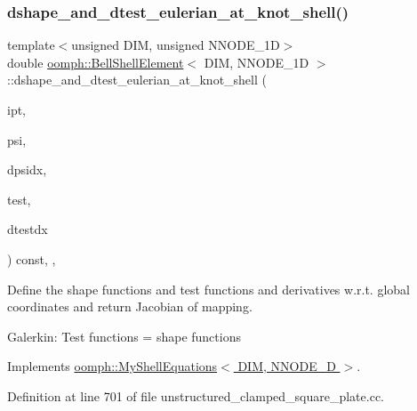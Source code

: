 \subsubsection{\texorpdfstring{dshape\+\_\+and\+\_\+dtest\+\_\+eulerian\+\_\+at\+\_\+knot\+\_\+shell()}{dshape\_and\_dtest\_eulerian\_at\_knot\_shell()}}
{\footnotesize\ttfamily template$<$unsigned D\+IM, unsigned N\+N\+O\+D\+E\+\_\+1D$>$ \\
double \hyperlink{classoomph_1_1BellShellElement}{oomph\+::\+Bell\+Shell\+Element}$<$ D\+IM, N\+N\+O\+D\+E\+\_\+1D $>$\+::dshape\+\_\+and\+\_\+dtest\+\_\+eulerian\+\_\+at\+\_\+knot\+\_\+shell (\begin{DoxyParamCaption}\item[{const unsigned \&}]{ipt,  }\item[{Shape \&}]{psi,  }\item[{D\+Shape \&}]{dpsidx,  }\item[{Shape \&}]{test,  }\item[{D\+Shape \&}]{dtestdx }\end{DoxyParamCaption}) const\hspace{0.3cm}{\ttfamily [inline]}, {\ttfamily [protected]}, {\ttfamily [virtual]}}

Define the shape functions and test functions and derivatives w.\+r.\+t. global coordinates and return Jacobian of mapping.

Galerkin\+: Test functions = shape functions 

Implements \hyperlink{classoomph_1_1MyShellEquations_a0800ff2f9716a3b0327624948ce792e1}{oomph\+::\+My\+Shell\+Equations$<$ D\+I\+M, N\+N\+O\+D\+E\+\_\+D $>$}.



Definition at line 701 of file unstructured\+\_\+clamped\+\_\+square\+\_\+plate.\+cc.

\mbox{\label{classoomph_1_1BellShellElement_aab519c12f08b5a723d6eab3e1a0a3e84}} 

